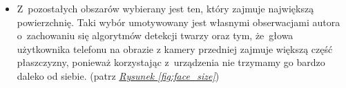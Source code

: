 \begin{itemize}
    \item Z~pozostałych obszarów wybierany jest ten, który zajmuje największą powierzchnię. Taki wybór umotywowany jest własnymi obserwacjami autora o~zachowaniu się algorytmów detekcji twarzy oraz tym, że~głowa użytkownika telefonu na obrazie z kamery przedniej zajmuje większą część płaszczyzny, ponieważ korzystając z~urządzenia nie trzymamy go bardzo daleko od siebie. (patrz \hyperref[{fig:face_size}]{\textit{Rysunek \ref{fig:face_size}}})
    
    \begin{figure}[!h]
        \begin{center}
            \hspace{8mm}

\end{center}
\end{figure}
\end{itemize}
